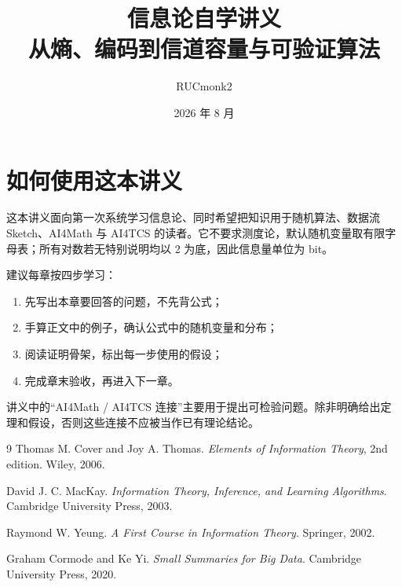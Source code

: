 \documentclass[UTF8,zihao=-4,oneside,fontset=fandol]{ctexrep}
\title{\heiti 信息论自学讲义\\[0.5em]
\Large 从熵、编码到信道容量与可验证算法}
\author{RUCmonk2}
\date{2026 年 8 月}
\theoremstyle{remark}
\begin{document}
\hypersetup{pageanchor=false}
\maketitle
\hypersetup{pageanchor=true}

\chapter*{如何使用这本讲义}

这本讲义面向第一次系统学习信息论、同时希望把知识用于随机算法、数据流 Sketch、AI4Math 与 AI4TCS 的读者。它不要求测度论，默认随机变量取有限字母表；所有对数若无特别说明均以 2 为底，因此信息量单位为 bit。

建议每章按四步学习：
\begin{enumerate}
  \item 先写出本章要回答的问题，不先背公式；
  \item 手算正文中的例子，确认公式中的随机变量和分布；
  \item 阅读证明骨架，标出每一步使用的假设；
  \item 完成章末验收，再进入下一章。
\end{enumerate}

讲义中的“AI4Math / AI4TCS 连接”主要用于提出可检验问题。除非明确给出定理和假设，否则这些连接不应被当作已有理论结论。

\tableofcontents
\clearpage









\begin{thebibliography}{9}
Thomas M. Cover and Joy A. Thomas.
\newblock \emph{Elements of Information Theory}, 2nd edition.
\newblock Wiley, 2006.

David J. C. MacKay.
\newblock \emph{Information Theory, Inference, and Learning Algorithms}.
\newblock Cambridge University Press, 2003.

Raymond W. Yeung.
\newblock \emph{A First Course in Information Theory}.
\newblock Springer, 2002.

Graham Cormode and Ke Yi.
\newblock \emph{Small Summaries for Big Data}.
\newblock Cambridge University Press, 2020.
\end{thebibliography}
\end{document}
